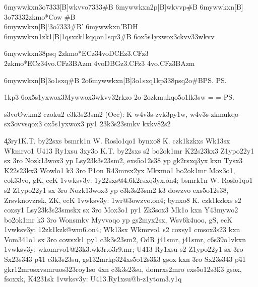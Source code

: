 \xo6mywwkxn{\23o7333}[B]{{\2wkvv\3o7333{#B}}}
\xo6mywwkxn{\22p}[B]{{\2wkvv\2p{#B}}}
\xo6mywwkxn{\ovmyno}[B]{\\{\23o7333{\r2zkmo*{Cow} #B}}\\}
\xo6mywwkxn{\psvo}[B]{`\23o7333{#B}'}
\xo6mywwkxn{\ec}{{'BDH}}        %
\xo6mywwkxn{\wk1zk1}[B]{\wk1qsxzk1{\1kqqon1sqr3#B}}
\xo6ox5s1yxwox3{ckvv33}{\2wkvv}{}

\xo6mywwkxn{\owz38psq}{
\r2zkmo*{ECz3}\14vo{DCEz3}{.CFz3}\\
\r2zkmo*{ECz3}\14vo{.CFz3}{BAzm}
\14vo{DBGz3}{.CFz3}
\14vo{.CFz3}{BAzm}}

\spWW\xo6mywwkxn{\Occpsq}[B]{\mox3o1sxq{#B}}
\ov2o\xo6mywwkxn{\Occpsq}[B]{\mox3o1sxq\spn1kp3\owz38psq\ov2o{#B}\ps}
\ps

\spn1kp3
\xo6ox5s1yxwox3{Mywwox3}{\2wkvv\s32rkzo }{}
%
\ov2o  %
  \42ozkmukqo{5o1lk3sw}
  =
  =
\ps



\3s3vo{Owkm2 czoku2 c3k3s23sm2 (Occ): K w4v3s-zvk3py1w, w4v3s-zkmukqo
sx3ovvsqox3 ox5s1yxwox3 py1 23k3s23smkv kxkv82s2}


\k43ry1{K.T. by22sxs \kxn bsmrk1n W. Roslo1qo1 \kxn bynxo8 K. czk1kzkxs
\kxn Wk13sx W{\"k}mrvo1 \kxn U413 Ry1xsu \pyy3xy3o{%
    K.T. by22sxs s2 bo2ok1mr K22s23kx3 Z1ypo22y1 sx 3ro Nozk13wox3 yp
    Lsy23k3s23sm2, exs5o12s38 yp gk2rsxq3yx kxn Tysx3 K22s23kx3 Wowlo1 k3
    3ro P1on R43mrsx2yx Mkxmo1 bo2ok1mr Mox3o1, cok33vo, gK, ecK
    \41v{wksv3y: 1y22sxs@4.6k2rsxq3yx.on4};
    bsmrk1n W. Roslo1qo1 s2 Z1ypo22y1 sx 3ro Nozk13wox3 yp c3k3s23sm2 k3
    dowzvo exs5o12s38, Zrsvknovzrsk, ZK, ecK \41v{wksv3y: 1wr@3owzvo.on4};
    bynxo8 K. czk1kzkxs s2 coxsy1 Lsy23k3s23smskx sx 3ro Mox3o1 py1 Zk3sox3
    Mk1o kxn Y43mywo2 bo2ok1mr k3 3ro Wonsmkv Myvvoqo yp gs2myx2sx,
    Wsv6k4uoo, gS, ecK \41v{wksv3y: 12zk1kzk@wm6.on4};
    Wk13sx W{\"k}mrvo1 s2 coxsy1 cmsox3s23 kxn Vom341o1 sx 3ro cowsxk1 py1
    c3k3s23sm2, OdR j41smr, j41smr, c6s39o1vkxn
    \41v{wksv3y: wkomrvo1@23k3.wk3r.o3r9.mr};
    U413 Ry1xsu s2 Z1ypo22y1 sx 3ro Sx23s343 p{\"4}1 c3k3s23su,
    gs132mrkp324xs5o12s3{\"k}3 gsox kxn 3ro Sx23s343 p{\"4}1
    gkr12mrosxvsmruos323roy1so 4xn c3k3s23su, domrxs2mro exs5o12s3{\"k}3
    gsox, fsoxxk, K4231sk \41v{wksv3y: U413.Ry1xsu@b-z1ytom3.y1q}}}

